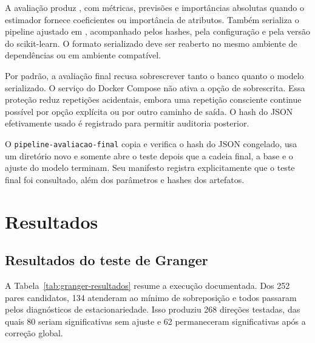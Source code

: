 \documentclass[12pt,a4paper]{article}
\begin{document}
A avaliação produz
, com métricas, previsões e
importâncias absolutas quando o estimador fornece coeficientes ou importância
de atributos. Também serializa o pipeline ajustado em
, acompanhado pelos hashes, pela
configuração e pela versão do scikit-learn. O formato serializado deve ser
reaberto no mesmo ambiente de dependências ou em ambiente compatível.

Por padrão, a avaliação final recusa sobrescrever tanto o banco quanto o modelo
serializado. O serviço do Docker Compose não ativa a opção de sobrescrita.
Essa proteção reduz repetições acidentais, embora uma repetição consciente
continue possível por opção explícita ou por outro caminho de saída. O hash do
JSON efetivamente usado é registrado para permitir auditoria posterior.

O \texttt{pipeline-avaliacao-final} copia e verifica o hash do JSON congelado,
usa um diretório novo e somente abre o teste depois que a cadeia final, a base e
o ajuste do modelo terminam. Seu manifesto registra explicitamente que o teste
final foi consultado, além dos parâmetros e hashes dos artefatos.


\section{Resultados}

\subsection{Resultados do teste de Granger}

A Tabela~\ref{tab:granger-resultados} resume a execução documentada. Dos 252
pares candidatos, 134 atenderam ao mínimo de sobreposição e todos passaram
pelos diagnósticos de estacionariedade. Isso produziu 268 direções testadas,
das quais 80 seriam significativas sem ajuste e 62 permaneceram significativas
após a correção global.
\end{document}
